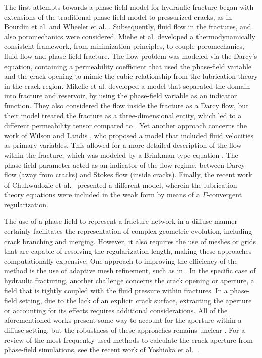 The first attempts towards a phase-field model for hydraulic fracture began with extensions of the traditional phase-field model to pressurized cracks, as in Bourdin et al. \cite{bourdin2012variational} and Wheeler et al. \cite{wheeler2014augmented}. Subsequently, fluid flow in the fractures, and also poromechanics were considered. Miehe et al. \cite{miehe2015minimization, miehe2016phase} developed a thermodynamically consistent framework, from minimization principles, to couple poromechanics, fluid-flow and phase-field fracture. The flow problem was modeled via the Darcy's equation, containing a permeability coefficient that used the phase-field variable and the crack opening to mimic the cubic relationship from the lubrication theory in the crack region. Mikelic et al. \cite{mikelic2015phase1, mikelic2015phase2} developed a model that separated the domain into fracture and reservoir, by using the phase-field variable as an indicator function. They also considered the flow inside the fracture as a Darcy flow, but their model treated the fracture as a three-dimensional entity, which led to a different permeability tensor compared to \cite{miehe2015minimization, miehe2016phase}.  Yet another approach concerns the work of Wilson and Landis \cite{wilson2016phase}, who proposed a model that included fluid velocities as primary variables. This allowed for a more detailed description of the flow within the fracture, which was modeled by a Brinkman-type equation \cite{brinkman1949calculation}. The phase-field parameter acted as an indicator of the flow regime, between Darcy flow (away from cracks) and Stokes flow (inside cracks).  Finally, the recent work of Chukwudozie et al.\ \cite{chukwudozie2019variational} presented a different model, wherein the lubrication theory equations were included in the weak form by means of a $\Gamma$-convergent regularization. 

The use of a phase-field to represent a fracture network in a diffuse manner certainly facilitates the representation of complex geometric evolution, including crack branching and merging. However, it also requires the use of meshes or grids that are capable of resolving the regularization length, making these approaches computationally expensive. One approach to improving the efficiency of the method is the use of adaptive mesh refinement, such as in \cite{heister2015primal, lee2017iterative, Wick-adaptive-2020,Gupta-adaptive-2022}. In the specific case of hydraulic fracturing, another challenge concerns the crack opening or aperture, a field that is tightly coupled with the fluid pressure within fractures. In a phase-field setting, due to the lack of an explicit crack surface, extracting the aperture or accounting for its effects requires additional considerations.  All of the aforementioned  works present some way to account for the aperture within a diffuse setting, but the robustness of these approaches remains unclear \cite{lecampion2018numerical}. For a review of the most frequently used methods to calculate the crack aperture from phase-field simulations, see the recent work of Yoshioka et al.\ \cite{yoshioka2020crack}.

